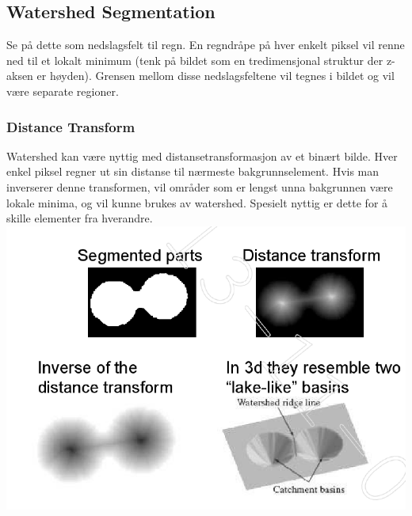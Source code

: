 \subsection{Watershed Segmentation}
Se på dette som nedslagsfelt til regn. En regndråpe på hver enkelt piksel vil renne ned til et lokalt minimum (tenk på bildet som en tredimensjonal struktur der z-aksen er høyden). Grensen mellom disse nedslagsfeltene vil tegnes i bildet og vil være separate regioner.

\subsubsection{Distance Transform}
Watershed kan være nyttig med distansetransformasjon av et binært bilde. Hver enkel piksel regner ut sin distanse til nærmeste bakgrunnselement. Hvis man inverserer denne transformen, vil områder som er lengst unna bakgrunnen være lokale minima, og vil kunne brukes av watershed. Spesielt nyttig er dette for å skille elementer fra hverandre.
\\ \includegraphics[width=\textwidth]{Bilder/watershed.png}

